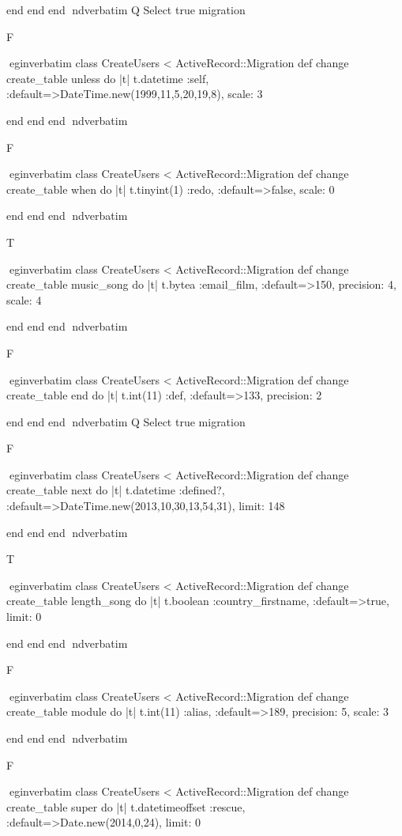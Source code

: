     end 
  end 
end
nd{verbatim}
Q
 Select true migration

F

egin{verbatim}
 class CreateUsers < ActiveRecord::Migration 
  def change 
    create_table unless do |t| 
      t.datetime :self, :default=>DateTime.new(1999,11,5,20,19,8), scale: 3
    
    end 
  end 
end
nd{verbatim}

F

egin{verbatim}
 class CreateUsers < ActiveRecord::Migration 
  def change 
    create_table when do |t| 
      t.tinyint(1) :redo, :default=>false, scale: 0
    
    end 
  end 
end
nd{verbatim}

T

egin{verbatim}
 class CreateUsers < ActiveRecord::Migration 
  def change 
    create_table music_song do |t| 
      t.bytea :email_film, :default=>150, precision: 4, scale: 4
    
    end 
  end 
end
nd{verbatim}

F

egin{verbatim}
 class CreateUsers < ActiveRecord::Migration 
  def change 
    create_table end do |t| 
      t.int(11) :def, :default=>133, precision: 2
    
    end 
  end 
end
nd{verbatim}
Q
 Select true migration

F

egin{verbatim}
 class CreateUsers < ActiveRecord::Migration 
  def change 
    create_table next do |t| 
      t.datetime :defined?, :default=>DateTime.new(2013,10,30,13,54,31), limit: 148
    
    end 
  end 
end
nd{verbatim}

T

egin{verbatim}
 class CreateUsers < ActiveRecord::Migration 
  def change 
    create_table length_song do |t| 
      t.boolean :country_firstname, :default=>true, limit: 0
    
    end 
  end 
end
nd{verbatim}

F

egin{verbatim}
 class CreateUsers < ActiveRecord::Migration 
  def change 
    create_table module do |t| 
      t.int(11) :alias, :default=>189, precision: 5, scale: 3
    
    end 
  end 
end
nd{verbatim}

F

egin{verbatim}
 class CreateUsers < ActiveRecord::Migration 
  def change 
    create_table super do |t| 
      t.datetimeoffset :rescue, :default=>Date.new(2014,0,24), limit: 0
    
